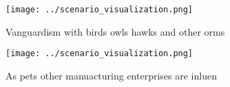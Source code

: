 \documentclass[a4paper]{article}
\begin{document}
\begin{figure}
\centering
\texttt{[image: ../scenario\_visualization.png]}
\caption{Vanguardism with birds owls hawks and other orms 
}
\end{figure}
 
\begin{figure}
\centering
\texttt{[image: ../scenario\_visualization.png]}
\caption{As pets other manuacturing enterprises are inluen
}
\end{figure}
 
\end{document}
